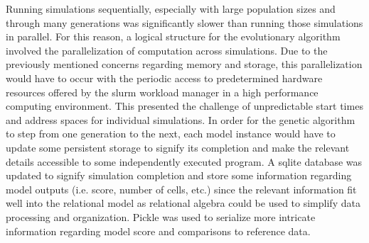 \par Running simulations sequentially, especially with large population sizes and through many generations was significantly slower than running those simulations in parallel. For this reason, a logical structure for the evolutionary algorithm involved the parallelization of computation across simulations. Due to the previously mentioned concerns regarding memory and storage, this parallelization would have to occur with the periodic access to predetermined hardware resources offered by the slurm workload manager in a high performance computing environment. This presented the challenge of unpredictable start times and address spaces for individual simulations. In order for the genetic algorithm to step from one generation to the next, each model instance would have to update some persistent storage to signify its completion and make the relevant details accessible to some independently executed program. A sqlite database was updated to signify simulation completion and store some information regarding model outputs (i.e. score, number of cells, etc.) since the relevant information fit well into the relational model as relational algebra could be used to simplify data processing and organization. Pickle was used to serialize more intricate information regarding model score and comparisons to reference data.

